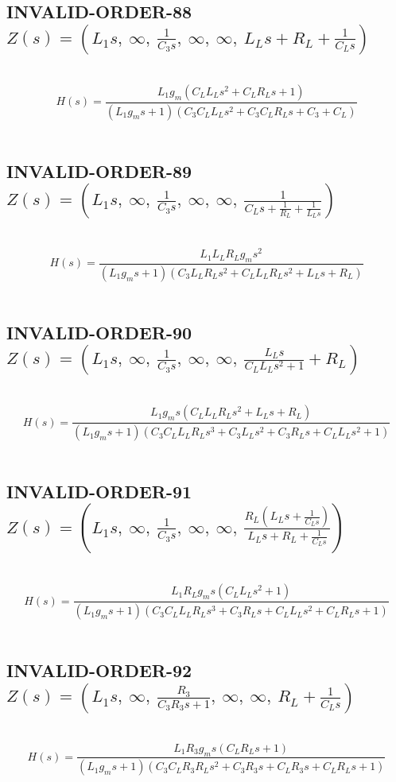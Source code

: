 \documentclass{article}
\begin{document}
\subsection{INVALID-ORDER-88 $Z(s) = \left( L_{1} s, \  \infty, \  \frac{1}{C_{3} s}, \  \infty, \  \infty, \  L_{L} s + R_{L} + \frac{1}{C_{L} s}\right)$ } \ 
\textbf{\[H(s) = \frac{L_{1} g_{m} \left(C_{L} L_{L} s^{2} + C_{L} R_{L} s + 1\right)}{\left(L_{1} g_{m} s + 1\right) \left(C_{3} C_{L} L_{L} s^{2} + C_{3} C_{L} R_{L} s + C_{3} + C_{L}\right)}\] } \ 
\subsection{INVALID-ORDER-89 $Z(s) = \left( L_{1} s, \  \infty, \  \frac{1}{C_{3} s}, \  \infty, \  \infty, \  \frac{1}{C_{L} s + \frac{1}{R_{L}} + \frac{1}{L_{L} s}}\right)$ } \ 
\textbf{\[H(s) = \frac{L_{1} L_{L} R_{L} g_{m} s^{2}}{\left(L_{1} g_{m} s + 1\right) \left(C_{3} L_{L} R_{L} s^{2} + C_{L} L_{L} R_{L} s^{2} + L_{L} s + R_{L}\right)}\] } \ 
\subsection{INVALID-ORDER-90 $Z(s) = \left( L_{1} s, \  \infty, \  \frac{1}{C_{3} s}, \  \infty, \  \infty, \  \frac{L_{L} s}{C_{L} L_{L} s^{2} + 1} + R_{L}\right)$ } \ 
\textbf{\[H(s) = \frac{L_{1} g_{m} s \left(C_{L} L_{L} R_{L} s^{2} + L_{L} s + R_{L}\right)}{\left(L_{1} g_{m} s + 1\right) \left(C_{3} C_{L} L_{L} R_{L} s^{3} + C_{3} L_{L} s^{2} + C_{3} R_{L} s + C_{L} L_{L} s^{2} + 1\right)}\] } \ 
\subsection{INVALID-ORDER-91 $Z(s) = \left( L_{1} s, \  \infty, \  \frac{1}{C_{3} s}, \  \infty, \  \infty, \  \frac{R_{L} \left(L_{L} s + \frac{1}{C_{L} s}\right)}{L_{L} s + R_{L} + \frac{1}{C_{L} s}}\right)$ } \ 
\textbf{\[H(s) = \frac{L_{1} R_{L} g_{m} s \left(C_{L} L_{L} s^{2} + 1\right)}{\left(L_{1} g_{m} s + 1\right) \left(C_{3} C_{L} L_{L} R_{L} s^{3} + C_{3} R_{L} s + C_{L} L_{L} s^{2} + C_{L} R_{L} s + 1\right)}\] } \ 
\subsection{INVALID-ORDER-92 $Z(s) = \left( L_{1} s, \  \infty, \  \frac{R_{3}}{C_{3} R_{3} s + 1}, \  \infty, \  \infty, \  R_{L} + \frac{1}{C_{L} s}\right)$ } \ 
\textbf{\[H(s) = \frac{L_{1} R_{3} g_{m} s \left(C_{L} R_{L} s + 1\right)}{\left(L_{1} g_{m} s + 1\right) \left(C_{3} C_{L} R_{3} R_{L} s^{2} + C_{3} R_{3} s + C_{L} R_{3} s + C_{L} R_{L} s + 1\right)}\] } \ 
\end{document}
